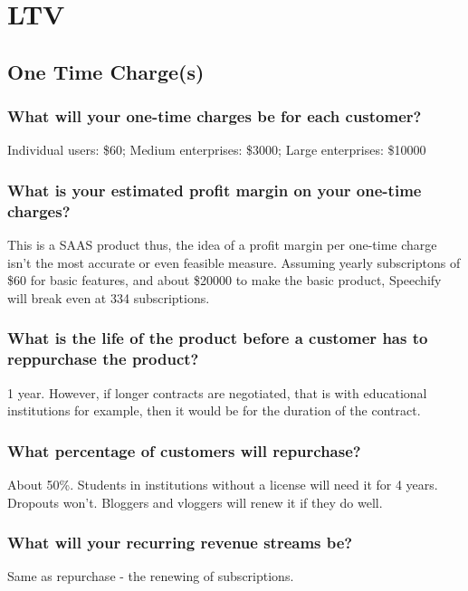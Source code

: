 \documentclass{article}
\begin{document}
\section{LTV}
    \subsection{One Time Charge(s)}
        \subsubsection{What will your one-time charges be for each customer?}
        Individual users: \$60; Medium enterprises: \$3000; Large enterprises: \$10000

        \subsubsection{What is your estimated profit margin on your one-time charges?}
        This is a SAAS product thus, the idea of a profit margin per one-time charge isn't the most accurate or even feasible measure. Assuming yearly subscriptons of \$60 for basic features, and about \$20000 to make the basic product, Speechify will break even at 334 subscriptions.

        \subsubsection{What is the life of the product before a customer has to reppurchase the product?}

        1 year. However, if longer contracts are negotiated, that is with educational institutions for example, then it would be for the duration of the contract.

        \subsubsection{What percentage of customers will repurchase?}
        
        About 50\%. Students in institutions without a license will need it for 4 years. Dropouts won't. Bloggers and vloggers will renew it if they do well.

        \subsubsection{What will your recurring revenue streams be?}

        Same as repurchase - the renewing of subscriptions.
\end{document}
